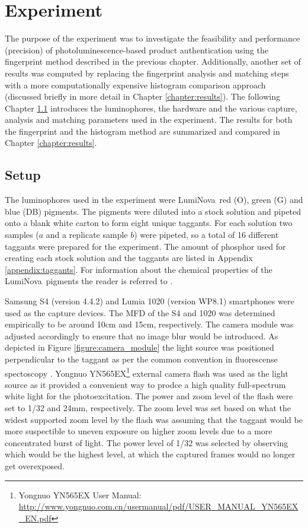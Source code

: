 \documentclass[thesis.tex]{subfiles}
\begin{document}
\chapter{Experiment}
\label{chapter:experiment}

The purpose of the experiment was to investigate the feasibility and performance (precision) of photoluminescence-based product authentication using the fingerprint method described in the previous chapter. Additionally, another set of results was computed by replacing the fingerprint analysis and matching steps with a more computationally expensive histogram comparison approach (discussed briefly in more detail in Chapter \ref{chapter:results}). The following Chapter \ref{chapter:setup} introduces the luminophores, the hardware and the various capture, analysis and matching parameters used in the experiment. The results for both the fingerprint and the histogram method are summarized and compared in Chapter \ref{chapter:results}.

\section{Setup}
\label{chapter:setup}

The luminophores used in the experiment were LumiNova\textregistered\ red (O), green (G) and blue (DB) pigments. The pigments were diluted into a stock solution and pipeted onto a blank white carton to form eight unique taggants. For each solution two samples ($a$ and a replicate sample $b$) were pipeted, so a total of 16 different taggants were prepared for the experiment. The amount of phosphor used for creating each stock solution and the taggants are listed in Appendix \ref{appendix:taggants}. For information about the chemical properties of the LumiNova\textregistered\ pigments the reader is referred to \cite{luminova}.

Samsung S4 (version 4.4.2) and Lumia 1020 (version WP8.1) smartphones were used as the capture devices. The MFD of the S4 and 1020 was determined empirically to be around 10cm and 15cm, respectively. The camera module was adjusted accordingly to ensure that no image blur would be introduced. As depicted in Figure \ref{figure:camera_module} the light source was positioned perpendicular to the taggant as per the common convention in fluorescense spectoscopy \cite{spectroscopy-principles}. Yongnuo YN565EX\footnote{Yongnuo YN565EX User Manual: \url{http://www.yongnuo.com.cn/usermanual/pdf/USER_MANUAL_YN565EX_EN.pdf}} external camera flash was used as the light source as it provided a convenient way to prodce a high quality full-spectrum white light for the photoexcitation. The power and zoom level of the flash were set to 1/32 and 24mm, respectively. The zoom level was set based on what the widest supported zoom level by the flash was assuming that the taggant would be more suspectible to uneven exposure on higher zoom levels due to a more concentrated burst of light. The power level of 1/32 was selected by observing which would be the highest level, at which the captured frames would no longer get overexposed.
\end{document}
